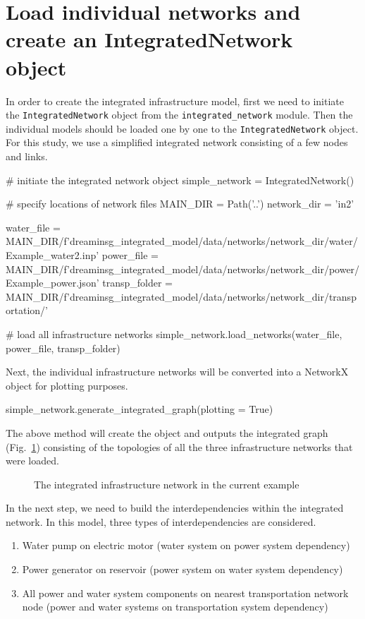 \documentclass[letterpaper,12pt,english]{sphinxmanual}
\begin{document}
\section{Load individual networks and create an {IntegratedNetwork} object}
In order to create the integrated infrastructure model, first we need to initiate the {\tt IntegratedNetwork} object from the {\tt integrated_network} module. Then the individual models should be loaded one by one to the {\tt IntegratedNetwork} object. For this study, we use a simplified integrated network consisting of a few nodes and links.

\begin{sphinxVerbatim}[commandchars=\\\{\}]
# initiate the integrated network object	
simple_network = IntegratedNetwork()

# specify locations of network files
MAIN_DIR = Path('..')
network_dir = 'in2'

water_file = MAIN_DIR/f'dreaminsg_integrated_model/data/networks/{network_dir}/water/Example_water2.inp'
power_file = MAIN_DIR/f'dreaminsg_integrated_model/data/networks/{network_dir}/power/Example_power.json'
transp_folder = MAIN_DIR/f'dreaminsg_integrated_model/data/networks/{network_dir}/transportation/'

# load all infrastructure networks
simple_network.load_networks(water_file, power_file, transp_folder)
\end{sphinxVerbatim}

Next, the individual infrastructure networks will be converted into a NetworkX object for plotting purposes.

\begin{sphinxVerbatim}[commandchars=\\\{\}]
simple_network.generate_integrated_graph(plotting = True)
\end{sphinxVerbatim}

The above method will create the object and outputs the integrated graph (Fig.~\ref{fig:integrated_net}) consisting of the topologies of all the three infrastructure networks that were loaded.

\begin{figure}[htbp]
	\centering
	\capstart
	\noindent{}
	\caption{The integrated infrastructure network in the current example}\label{fig:integrated_net}
\end{figure}

In the next step, we need to build the interdependencies within the integrated network. In this model, three types of interdependencies are considered.
\begin{enumerate}[noitemsep]
	\item Water pump on electric motor (water system on power system dependency)
	\item Power generator on reservoir (power system on water system dependency)
	\item All power and water system components on nearest transportation network node (power and water systems on transportation system dependency)
\end{enumerate}
\end{document}
